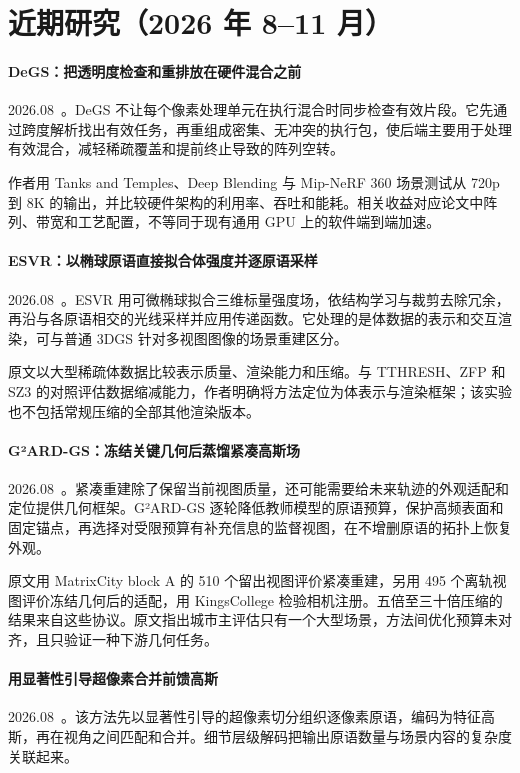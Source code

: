 \section{近期研究（2026 年 8--11 月）}
\paragraph{DeGS：把透明度检查和重排放在硬件混合之前}
2026.08~\cite{2608_02099}。DeGS 不让每个像素处理单元在执行混合时同步检查有效片段。它先通过跨度解析找出有效任务，再重组成密集、无冲突的执行包，使后端主要用于处理有效混合，减轻稀疏覆盖和提前终止导致的阵列空转。

作者用 Tanks and Temples、Deep Blending 与 Mip-NeRF 360 场景测试从 720p 到 8K 的输出，并比较硬件架构的利用率、吞吐和能耗。相关收益对应论文中阵列、带宽和工艺配置，不等同于现有通用 GPU 上的软件端到端加速。

\paragraph{ESVR：以椭球原语直接拟合体强度并逐原语采样}
2026.08~\cite{2608_05564}。ESVR 用可微椭球拟合三维标量强度场，依结构学习与裁剪去除冗余，再沿与各原语相交的光线采样并应用传递函数。它处理的是体数据的表示和交互渲染，可与普通 3DGS 针对多视图图像的场景重建区分。

原文以大型稀疏体数据比较表示质量、渲染能力和压缩。与 TTHRESH、ZFP 和 SZ3 的对照评估数据缩减能力，作者明确将方法定位为体表示与渲染框架；该实验也不包括常规压缩的全部其他渲染版本。

\paragraph{G²ARD-GS：冻结关键几何后蒸馏紧凑高斯场}
2026.08~\cite{2608_05704}。紧凑重建除了保留当前视图质量，还可能需要给未来轨迹的外观适配和定位提供几何框架。G²ARD-GS 逐轮降低教师模型的原语预算，保护高频表面和固定锚点，再选择对受限预算有补充信息的监督视图，在不增删原语的拓扑上恢复外观。

原文用 MatrixCity block A 的 510 个留出视图评价紧凑重建，另用 495 个离轨视图评价冻结几何后的适配，用 KingsCollege 检验相机注册。五倍至三十倍压缩的结果来自这些协议。原文指出城市主评估只有一个大型场景，方法间优化预算未对齐，且只验证一种下游几何任务。

\paragraph{用显著性引导超像素合并前馈高斯}
2026.08~\cite{2608_10712}。该方法先以显著性引导的超像素切分组织逐像素原语，编码为特征高斯，再在视角之间匹配和合并。细节层级解码把输出原语数量与场景内容的复杂度关联起来。

